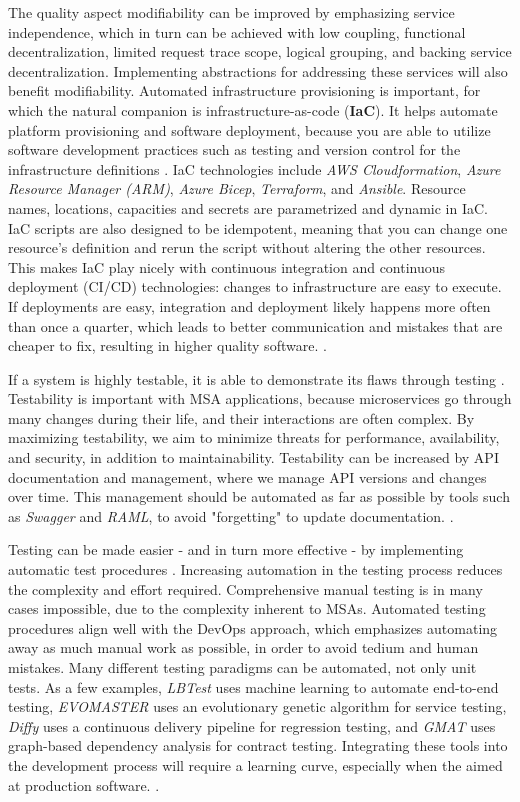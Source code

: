 \documentclass[utf8,english]{gradu3}
\begin{document}
The quality aspect modifiability can be  improved by emphasizing service
independence, which in turn can be achieved with low coupling, functional
decentralization, limited request trace scope, logical grouping, and backing
service decentralization. Implementing abstractions for addressing these
services will also benefit modifiability. Automated infrastructure provisioning
is important, for which the natural companion is infrastructure-as-code
(\textbf{IaC}). It helps automate platform provisioning and software deployment,
because you are able to utilize software development practices such as testing
and version control for the infrastructure definitions
\parencite{Microsoft2022-CNA}. IaC technologies include \textit{AWS Cloudformation},
\textit{Azure Resource Manager (ARM)}, \textit{Azure Bicep}, \textit{Terraform},
and \textit{Ansible}. Resource names, locations, capacities and secrets are
parametrized and dynamic in IaC. IaC scripts are also designed to be idempotent,
meaning that you can change one resource's definition and rerun the script
without altering the other resources. This makes IaC play nicely with continuous
integration and continuous deployment (CI/CD) technologies: changes to
infrastructure are easy to execute. If deployments are easy, integration and
deployment likely happens more often than once a quarter, which leads to better
communication and mistakes that are cheaper to fix, resulting in higher quality
software. \parencite{Microsoft2022-CNA}.

If a system is highly testable, it is able to demonstrate its flaws through testing
\parencite[17]{Li2021}. Testability is important with MSA applications, because
microservices go through many changes during their life, and their interactions
are often complex. By maximizing testability, we aim to minimize threats for
performance, availability, and security, in addition to maintainability.
Testability can be increased by API documentation and management, where we
manage API versions and changes over time. This management should be automated
as far as possible by tools such as \textit{Swagger} and \textit{RAML}, to avoid
"forgetting" to update documentation. \parencite[17]{Li2021}.

Testing can be made easier - and in turn more effective - by implementing
automatic test procedures \parencite[17]{Li2021}. Increasing automation in the
testing process reduces the complexity and effort required. Comprehensive manual
testing is in many cases impossible, due to the complexity inherent to MSAs.
Automated testing procedures align well with the DevOps approach, which
emphasizes automating away as much manual work as possible, in order to avoid
tedium and human mistakes. Many different testing paradigms can be automated,
not only unit tests. As a few examples, \textit{LBTest} uses machine learning to
automate end-to-end testing, \textit{EVOMASTER} uses an evolutionary genetic
algorithm for service testing, \textit{Diffy} uses a continuous delivery
pipeline for regression testing, and \textit{GMAT} uses graph-based dependency
analysis for contract testing. Integrating these tools into the development
process will require a learning curve, especially when the aimed at production
software. \parencite[18]{Li2021}.
\end{document}
